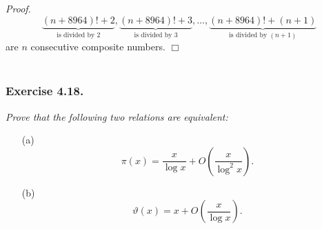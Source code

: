 \documentclass{article}
\begin{document}
\emph{Proof.}
  \[
    \underbrace{(n+8964)!+2}_{\text{is divided by $2$}},
    \underbrace{(n+8964)!+3}_{\text{is divided by $3$}}, \ldots,
    \underbrace{(n+8964)!+(n+1)}_{\text{is divided by $(n+1)$}}
  \]
  are $n$ consecutive composite numbers.
$\Box$ \\\\






\subsubsection*{Exercise 4.18.}
\emph{Prove that the following two relations are equivalent:}
\begin{enumerate}
\item[(a)]
  \[
    \pi(x) = \frac{x}{\log x} + O\left( \frac{x}{\log^2 x} \right).
  \]

\item[(b)]
  \[
    \vartheta(x) = x + O\left( \frac{x}{\log x} \right).
  \] \\
\end{enumerate}
\end{document}

